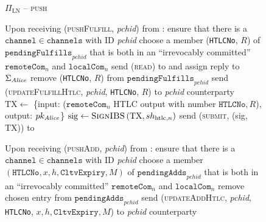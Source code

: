   \begin{figure}[H]
    \begin{protocolbox}{$\Pi_{\mathrm{LN}}$ -- \textsc{push}}
      \begin{algorithmic}[1]
        \State Upon receiving (\textsc{pushFulfill}, \textit{pchid}) from
        \environment:
        \label{alg:protocol:pushfulfill:start}
        \Indent
          \State ensure that there is a $\mathtt{channel} \in \mathtt{channels}$
          with ID \textit{pchid}
          \State choose a member (\texttt{HTLCNo}, $R$) of
          $\mathtt{pendingFulfills}_{\mathit{pchid}}$ that is both in an
          ``irrevocably committed'' $\mathtt{remoteCom}_n$ and
          $\mathtt{localCom}_n$
          \State send (\textsc{read}) to \ledger{} and assign reply to
          $\Sigma_{\mathit{Alice}}$
          \State remove (\texttt{HTLCNo}, $R$) from
          $\mathtt{pendingFulfills}_{\mathit{pchid}}$
            \State send (\textsc{updateFulfillHtlc}, \textit{pchid},
            \texttt{HTLCNo}, $R$) to \textit{pchid} counterparty
          \Else \ 
            \State $\mathrm{TX} \gets$ \{input: ($\mathtt{remoteCom}_n$ HTLC
            output with number $\mathtt{HTLCNo}, R$), output:
            $pk_{\mathit{Alice}}$\}
            \State $\mathrm{sig} \gets \textsc{SignIBS}\left(\mathrm{TX},
            sh_{\mathrm{htlc}, n}\right)$
            \State send (\textsc{submit}, (sig, TX)) to \ledger{}
            \label{alg:protocol:pushfulfill:submit}
          \EndIf
          \label{alg:protocol:pushfulfill:end}
        \EndIndent
        \Statex

        \State Upon receiving (\textsc{pushAdd}, \textit{pchid}) from
        \environment:
        \label{alg:protocol:pushadd:start}
        \Indent
          \State ensure that there is a $\mathtt{channel} \in \mathtt{channels}$
          with ID \textit{pchid}
          \State choose a member $\left(\mathtt{HTLCNo}, x, h,
          \mathtt{CltvExpiry}, M\right)$ of
          $\mathtt{pendingAdds}_{\mathit{pchid}}$ that is both in an
          ``irrevocably committed'' $\mathtt{remoteCom}_n$ and
          $\mathtt{localCom}_n$
          \label{alg:protocol:pay:pushadd:choose}
          \State remove chosen entry from
          $\mathtt{pendingAdds}_{\mathit{pchid}}$
          \State send (\textsc{updateAddHtlc}, \textit{pchid}, \texttt{HTLCNo},
          $x, h, \mathtt{CltvExpiry}, M$) to \textit{pchid} counterparty
          \label{alg:protocol:pushadd:end}
        \EndIndent
        \Statex


\end{algorithmic}
\end{protocolbox}
\end{figure}
